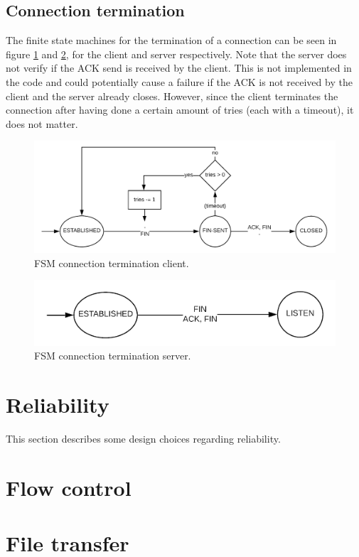 \documentclass[a4paper]{article}
\begin{document}
	\subsection{Connection termination}
	The finite state machines for the termination of a connection can be seen in figure \ref{fig: phase 3 client} and \ref{fig: phase 3 server}, for the client and server respectively. Note that the server does not verify if the ACK send is received by the client. This is not implemented in the code and could potentially cause a failure if the ACK is not received by the client and the server already closes. However, since the client terminates the connection after having done a certain amount of tries (each with a timeout), it does not matter.
	\begin{figure}[h]
		\centering
		\includegraphics[width = \textwidth]{phase3_client.png}
		\caption{FSM connection termination client.}
		\label{fig: phase 3 client}
	\end{figure}
	\begin{figure}[h]
		\centering
		\includegraphics[width = .7\textwidth]{phase3_server.png}
		\caption{FSM connection termination server.}
		\label{fig: phase 3 server}
	\end{figure}

\section{Reliability}
This section describes some design choices regarding reliability.

\section{Flow control}

\section{File transfer}
\end{document}
